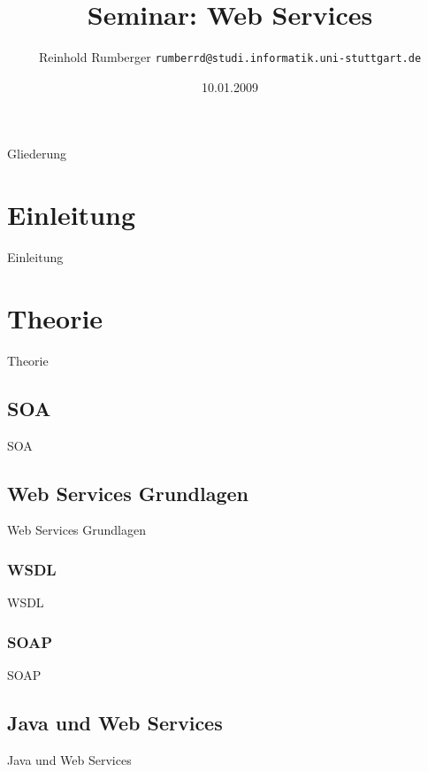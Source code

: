 \documentclass[ucs]{beamer}
\title{Seminar: Web Services}
\author[Reinhold Rumberger]{Reinhold Rumberger \texttt{rumberrd@studi.informatik.uni-stuttgart.de}}
\date{10.01.2009}
\begin{document}
  \begin{frame}
    \titlepage
  \end{frame}

  \begin{frame}{Gliederung}
    \tableofcontents
  \end{frame}

  \section{Einleitung}
  \begin{frame}{Einleitung}
  \end{frame}

  \section{Theorie}
  \begin{frame}{Theorie}
  \end{frame}

  \subsection{SOA}
  \begin{frame}{SOA}
  \end{frame}

  \subsection{Web Services Grundlagen}
  \begin{frame}{Web Services Grundlagen}
  \end{frame}

  \subsubsection{WSDL}
  \begin{frame}{WSDL}
  \end{frame}

  \subsubsection{SOAP}
  \begin{frame}{SOAP}
  \end{frame}

  \subsection{Java und Web Services}
  \begin{frame}{Java und Web Services}
  \end{frame}
\end{document}
